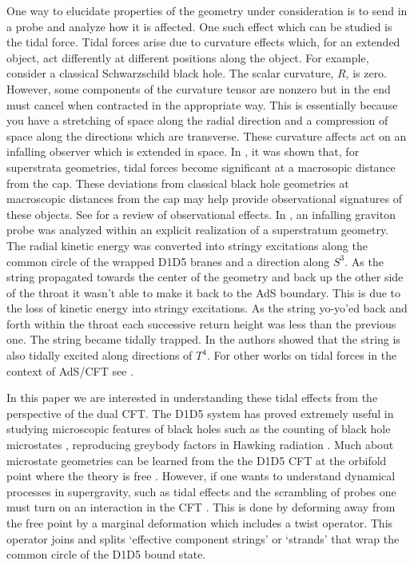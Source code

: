 \documentclass[11pt]{article}
\begin{document}
One way to elucidate properties of the geometry under consideration is to send in a probe and analyze how it is affected. One such effect which can be studied is the tidal force. Tidal forces arise due to curvature effects which, for an extended object, act differently at different positions along the object. For example, consider a classical Schwarzschild black hole. The scalar curvature, $R$, is zero. However, some components of the curvature tensor are nonzero but in the end must cancel when contracted in the appropriate way. This is essentially because you have a stretching of space along the radial direction and a compression of space along the directions which are transverse. These curvature affects act on an infalling observer which is extended in space. 
In \cite{tww,bmww,bhw}, it was shown that, for superstrata geometries, tidal forces become significant at a macrosopic distance from the cap. These deviations from classical black hole geometries at macroscopic distances from the cap may help provide observational signatures of these objects. See \cite{dm} for a review of observational effects. In \cite{mw}, an infalling graviton probe was analyzed within an explicit realization of a superstratum geometry. 
The radial kinetic energy was converted into stringy excitations along the common circle of the wrapped D1D5 branes and a direction along $S^3$.
As the string propagated towards the center of the geometry and back up the other side of the throat it wasn't able to make it back to the AdS boundary. This is due to the loss of kinetic energy into stringy excitations. As the string yo-yo'ed back and forth within the throat each successive return height was less than the previous one. The string became tidally trapped.  
In \cite{chl} the authors showed that the string is also tidally excited along directions of $T^4$. For other works on tidal forces in the context of AdS/CFT see \cite{stretching,craps,Engelsoy:2021fbk}.


In this paper we are interested in understanding these tidal effects from the perspective of the dual CFT. The D1D5 system has proved extremely useful in studying microscopic features of black holes such as the counting of black hole microstates \cite{sv}, reproducing greybody factors in Hawking radiation \cite{cm}. Much about microstate geometries can be learned from the the D1D5 CFT at the orbifold point where the theory is free \cite{lm1,lm2,dmw,Larsen:1999uk,orbifold2,Arutyunov:1997gt,Burrington:2012yq,taylor,Dei:2019iym}. However, if one wants to understand dynamical processes in supergravity, such as tidal effects and the scrambling of probes one must turn on an interaction in the CFT \cite{Avery:2010er,Burrington:2014yia,Carson:2016uwf,peet}. This is done by deforming away from the free point by a marginal deformation which includes a twist operator. This operator joins and splits `effective component strings' or `strands' that wrap the common circle of the D1D5 bound state. 
\end{document}
